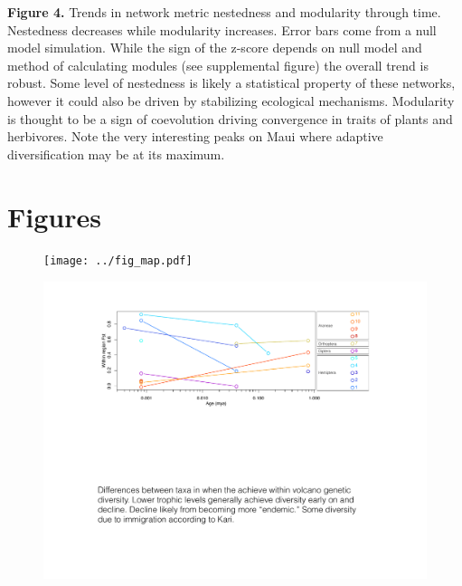 \documentclass[12pt]{article}
\begin{document}
\begin{linenumbers}
\vspace{2em}
\noindent
{\bf Figure 4.} Trends in network metric nestedness and modularity
through time. Nestedness decreases while modularity increases. Error
bars come from a null model simulation. While the sign of the z-score
depends on null model and method of calculating modules (see
supplemental figure) the overall trend is robust. Some level of
nestedness is likely a statistical property of these networks, however
it could also be driven by stabilizing ecological
mechanisms. Modularity is thought to be a sign of coevolution driving
convergence in traits of plants and herbivores. Note the very
interesting peaks on Maui where adaptive diversification may be at its
maximum.

\clearpage

\section*{Figures}

\begin{figure}[!htb]
  \centering
  \texttt{[image: ../fig\_map.pdf]} 
  \caption{}
  \label{fig:map}
\end{figure}

\begin{figure}[!hp]
  \centering
  \includegraphics[scale=0.7]{../fig_volcanoFst.pdf}
  \caption{}
  \label{fig:volcanoFst}
\end{figure}


\end{linenumbers}
\end{document}
